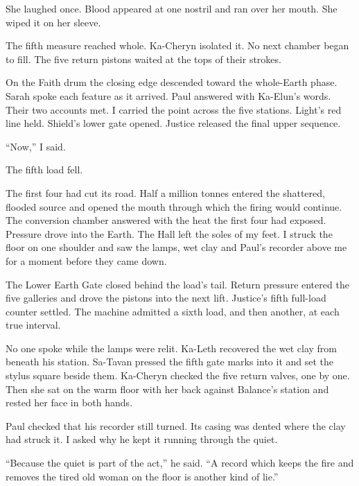 She laughed once. Blood appeared at one nostril and ran over her mouth. She wiped it on her sleeve.\par

The fifth measure reached whole. Ka-Cheryn isolated it. No next chamber began to fill. The five return pistons waited at the tops of their strokes.\par

On the Faith drum the closing edge descended toward the whole-Earth phase. Sarah spoke each feature as it arrived. Paul answered with Ka-Elun's words. Their two accounts met. I carried the point across the five stations. Light's red line held. Shield's lower gate opened. Justice released the final upper sequence.\par

``Now,'' I said.\par

The fifth load fell.\par

The first four had cut its road. Half a million tonnes entered the shattered, flooded source and opened the mouth through which the firing would continue. The conversion chamber answered with the heat the first four had exposed. Pressure drove into the Earth. The Hall left the soles of my feet. I struck the floor on one shoulder and saw the lamps, wet clay and Paul's recorder above me for a moment before they came down.\par

The Lower Earth Gate closed behind the load's tail. Return pressure entered the five galleries and drove the pistons into the next lift. Justice's fifth full-load counter settled. The machine admitted a sixth load, and then another, at each true interval.\par

\ornament

No one spoke while the lamps were relit. Ka-Leth recovered the wet clay from beneath his station. Sa-Tavan pressed the fifth gate marks into it and set the stylus square beside them. Ka-Cheryn checked the five return valves, one by one. Then she sat on the warm floor with her back against Balance's station and rested her face in both hands.\par

Paul checked that his recorder still turned. Its casing was dented where the clay had struck it. I asked why he kept it running through the quiet.\par

``Because the quiet is part of the act,'' he said. ``A record which keeps the fire and removes the tired old woman on the floor is another kind of lie.''\par

